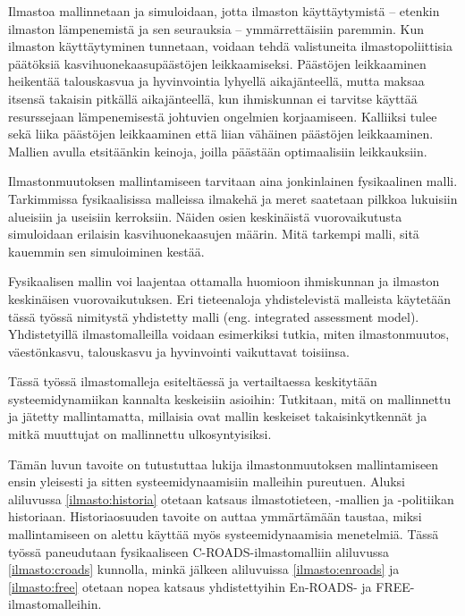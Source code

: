 \documentclass[finnish,12pt,a4paper,pdftex]{article}
\begin{document}
\begin{onehalfspacing}
Ilmastoa mallinnetaan ja simuloidaan, jotta ilmaston käyttäytymistä -- etenkin ilmaston lämpenemistä ja sen seurauksia -- ymmärrettäisiin paremmin. Kun ilmaston käyttäytyminen tunnetaan, voidaan tehdä valistuneita ilmastopoliittisia päätöksiä kasvihuonekaasupäästöjen leikkaamiseksi. \cite{CroadsFlightSimulator2011} Päästöjen leikkaaminen heikentää talouskasvua ja hyvinvointia lyhyellä aikajänteellä, mutta maksaa itsensä takaisin pitkällä aikajänteellä, kun ihmiskunnan ei tarvitse käyttää resurssejaan lämpenemisestä johtuvien ongelmien korjaamiseen. Kalliiksi tulee sekä liika päästöjen leikkaaminen että liian vähäinen päästöjen leikkaaminen. Mallien avulla etsitäänkin keinoja, joilla päästään optimaalisiin leikkauksiin. \cite{Fiddaman2002}

Ilmastonmuutoksen mallintamiseen tarvitaan aina jonkinlainen fysikaalinen malli. Tarkimmissa fysikaalisissa malleissa ilmakehä ja meret saatetaan pilkkoa lukuisiin alueisiin ja useisiin kerroksiin. Näiden osien keskinäistä vuorovaikutusta simuloidaan erilaisin kasvihuonekaasujen määrin. Mitä tarkempi malli, sitä kauemmin sen simuloiminen kestää. \cite{CroadsFlightSimulator2011} 

Fysikaalisen mallin voi laajentaa ottamalla huomioon ihmiskunnan ja ilmaston keskinäisen vuorovaikutuksen. Eri tieteenaloja yhdistelevistä malleista käytetään tässä työssä nimitystä yhdistetty malli (eng. integrated assessment model). Yhdistetyillä ilmastomalleilla voidaan esimerkiksi tutkia, miten ilmastonmuutos, väestönkasvu, talouskasvu ja hyvinvointi vaikuttavat toisiinsa. \cite{U.S.DepartmentofEnergy2009} 

Tässä työssä ilmastomalleja esiteltäessä ja vertailtaessa keskitytään systeemidynamiikan kannalta keskeisiin asioihin: Tutkitaan, mitä on mallinnettu ja jätetty mallintamatta, millaisia ovat mallin keskeiset takaisinkytkennät ja mitkä muuttujat on mallinnettu ulkosyntyisiksi. 

Tämän luvun tavoite on tutustuttaa lukija ilmastonmuutoksen mallintamiseen ensin yleisesti ja sitten systeemidynaamisiin malleihin pureutuen. Aluksi aliluvussa \ref{ilmasto:historia} otetaan katsaus ilmastotieteen, -mallien ja -politiikan historiaan. Historiaosuuden tavoite on auttaa ymmärtämään taustaa, miksi mallintamiseen on alettu käyttää myös systeemidynaamisia menetelmiä. Tässä työssä paneudutaan fysikaaliseen C-ROADS-ilmastomalliin aliluvussa \ref{ilmasto:croads} kunnolla, minkä jälkeen aliluvuissa \ref{ilmasto:enroads} ja \ref{ilmasto:free} otetaan nopea katsaus yhdistettyihin En-ROADS- ja FREE-ilmastomalleihin. 


\end{onehalfspacing}
\end{document}
